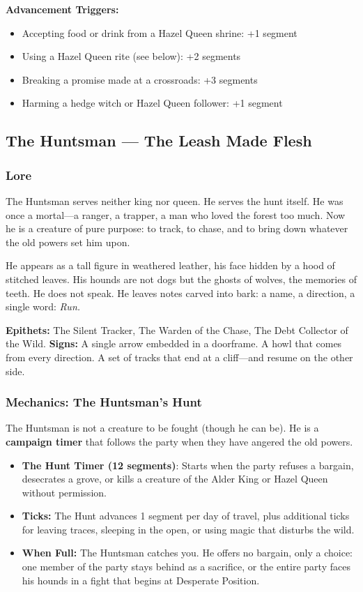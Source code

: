 \documentclass[11pt]{article}
\begin{document}
\textbf{Advancement Triggers:}
\begin{itemize}
\item Accepting food or drink from a Hazel Queen shrine: +1 segment
\item Using a Hazel Queen rite (see below): +2 segments
\item Breaking a promise made at a crossroads: +3 segments
\item Harming a hedge witch or Hazel Queen follower: +1 segment
\end{itemize}

\subsection{The Huntsman --- The Leash Made Flesh}

\subsubsection{Lore}

The Huntsman serves neither king nor queen. He serves the hunt itself. He was once a mortal---a ranger, a trapper, a man who loved the forest too much. Now he is a creature of pure purpose: to track, to chase, and to bring down whatever the old powers set him upon.

He appears as a tall figure in weathered leather, his face hidden by a hood of stitched leaves. His hounds are not dogs but the ghosts of wolves, the memories of teeth. He does not speak. He leaves notes carved into bark: a name, a direction, a single word: \textit{Run.}

\textbf{Epithets:} The Silent Tracker, The Warden of the Chase, The Debt Collector of the Wild.
\textbf{Signs:} A single arrow embedded in a doorframe. A howl that comes from every direction. A set of tracks that end at a cliff---and resume on the other side.

\subsubsection{Mechanics: The Huntsman's Hunt}

The Huntsman is not a creature to be fought (though he can be). He is a \textbf{campaign timer} that follows the party when they have angered the old powers.

\begin{itemize}
\item \textbf{The Hunt Timer (12 segments)}: Starts when the party refuses a bargain, desecrates a grove, or kills a creature of the Alder King or Hazel Queen without permission.
\item \textbf{Ticks:} The Hunt advances 1 segment per day of travel, plus additional ticks for leaving traces, sleeping in the open, or using magic that disturbs the wild.
\item \textbf{When Full:} The Huntsman catches you. He offers no bargain, only a choice: one member of the party stays behind as a sacrifice, or the entire party faces his hounds in a fight that begins at Desperate Position.
\end{itemize}
\end{document}
